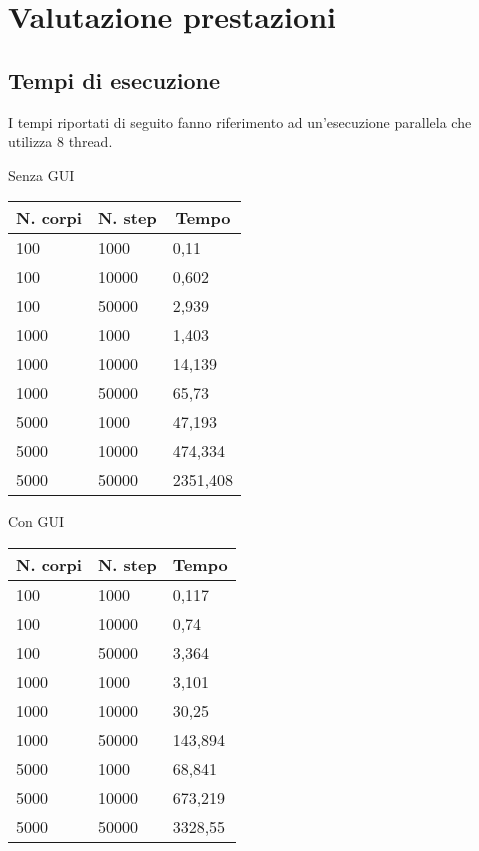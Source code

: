 \documentclass[12pt,a4paper,oneside,draft]{article}
\begin{document}
	\section{Valutazione prestazioni}
	\subsection{Tempi di esecuzione}
	I tempi riportati di seguito fanno riferimento ad un'esecuzione parallela che utilizza 8 thread.
	
	\hfill
	\begin{minipage}{.4\textwidth}
		Senza GUI
		
		\begin{tabular}{|l|l|l|}
			\hline
			\multicolumn{1}{|c|}{\textbf{N. corpi}} & \multicolumn{1}{c|}{\textbf{N. step}} & \multicolumn{1}{c|}{\textbf{Tempo}} \\ \hline
			100 & 1000 & 0,11 \\ \hline
			100 & 10000 & 0,602 \\ \hline
			100 & 50000 & 2,939 \\ \hline
			1000 & 1000 & 1,403 \\ \hline
			1000 & 10000 & 14,139 \\ \hline
			1000 & 50000 & 65,73 \\ \hline
			5000 & 1000 & 47,193 \\ \hline
			5000 & 10000 & 474,334 \\ \hline
			5000 & 50000 & 2351,408 \\ \hline
		\end{tabular}
	\end{minipage}
	\hfill
	\begin{minipage}{.4\textwidth}
		Con GUI
		
		\begin{tabular}{|l|l|l|}
			\hline
			\multicolumn{1}{|c|}{\textbf{N. corpi}} & \multicolumn{1}{c|}{\textbf{N. step}} & \multicolumn{1}{c|}{\textbf{Tempo}} \\ \hline
			100 & 1000 & 0,117 \\ \hline
			100 & 10000 & 0,74 \\ \hline
			100 & 50000 & 3,364 \\ \hline
			1000 & 1000 & 3,101 \\ \hline
			1000 & 10000 & 30,25 \\ \hline
			1000 & 50000 & 143,894 \\ \hline
			5000 & 1000 & 68,841 \\ \hline
			5000 & 10000 & 673,219 \\ \hline
			5000 & 50000 & 3328,55 \\ \hline
		\end{tabular}
	\end{minipage}
	\hfill
\end{document}
